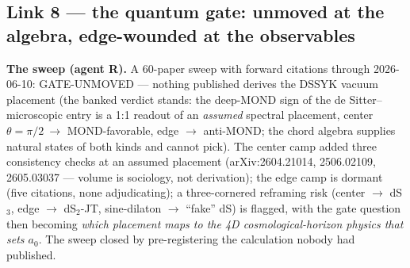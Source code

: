 \documentclass[11pt,a4paper]{article}
\begin{document}
\subsection{Link 8 --- the quantum gate: unmoved at the algebra, edge-wounded at the observables}

\textbf{The sweep (agent R).} A 60-paper sweep with forward citations through 2026-06-10: GATE-UNMOVED --- nothing published derives the DSSYK vacuum placement (the banked verdict stands: the deep-MOND sign of the de Sitter--microscopic entry is a 1:1 readout of an \emph{assumed} spectral placement, center $\theta = \pi/2\ \to$ MOND-favorable, edge $\to$ anti-MOND; the chord algebra supplies natural states of both kinds and cannot pick). The center camp added three consistency checks at an assumed placement (arXiv:2604.21014, 2506.02109, 2605.03037 --- volume is sociology, not derivation); the edge camp is dormant (five citations, none adjudicating); a three-cornered reframing risk (center $\to$ dS$_3$, edge $\to$ dS$_2$-JT, sine-dilaton $\to$ ``fake'' dS) is flagged, with the gate question then becoming \emph{which placement maps to the 4D cosmological-horizon physics that sets $a_{0}$}. The sweep closed by pre-registering the calculation nobody had published.
\end{document}
